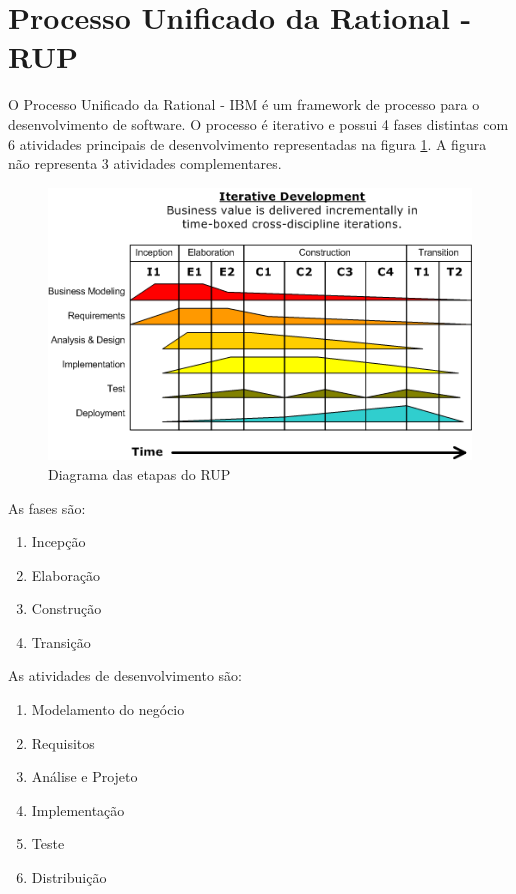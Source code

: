 \documentclass[
	11pt,				%
	openright,
	twoside,			%
	a4paper,			%
	english,			%
	french,
	brazil,				%
	sumario=tradicional
	]{abntex2}
\begin{document}
\section{Processo Unificado da Rational - RUP}

O Processo Unificado da Rational - IBM é um framework de processo para o desenvolvimento de software. O processo é iterativo e possui 4 fases distintas com 6 atividades principais de desenvolvimento representadas na figura \ref{fig:rup}. A figura não representa 3 atividades complementares.

\begin{figure}[ht]
\begin{center}
\includegraphics[scale=0.6]{File_Development-iterative-RUP-wiki.png}
\caption{Diagrama das etapas do RUP} \label{fig:rup}
\end{center}
\end{figure}

As fases são:
\begin{enumerate}
\item Incepção
\item Elaboração
\item Construção
\item Transição
\end{enumerate}

As atividades de desenvolvimento são:

\begin{enumerate}
\item Modelamento do negócio
\item Requisitos
\item Análise e Projeto
\item Implementação
\item Teste
\item Distribuição
\end{enumerate}
\end{document}
